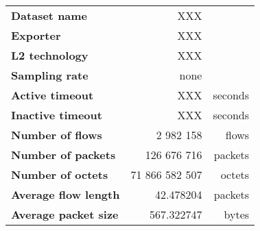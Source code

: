 \begin{tabular}{@{}lrr@{}}
\toprule
\textbf{Dataset name} & XXX & \\
\textbf{Exporter} & XXX & \\
\textbf{L2 technology} & XXX & \\
\textbf{Sampling rate} & none & \\
\textbf{Active timeout} & XXX & seconds \\
\textbf{Inactive timeout} & XXX & seconds \\
\midrule
\textbf{Number of flows} & 2 982 158 & flows \\
\textbf{Number of packets} & 126 676 716 & packets \\
\textbf{Number of octets} & 71 866 582 507 & octets \\
\textbf{Average flow length} & 42.478204 & packets \\
\textbf{Average packet size} & 567.322747 & bytes \\
\bottomrule
\end{tabular}


